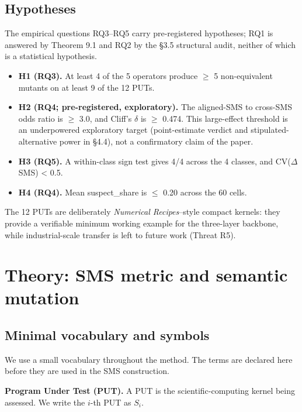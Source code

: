 \documentclass[acmsmall,screen,review]{acmart}
\providecommand{\tightlist}{\setlength{\itemsep}{0pt}\setlength{\parskip}{0pt}}
\begin{document}
\subsection{Hypotheses}\label{hypotheses}

The empirical questions RQ3--RQ5 carry pre-registered hypotheses; RQ1 is
answered by Theorem 9.1 and RQ2 by the §3.5 structural audit, neither of
which is a statistical hypothesis.

\begin{itemize}
\tightlist
\item
  \textbf{H1 (RQ3).} At least 4 of the 5 operators produce $\geq$ 5 non-equivalent
  mutants on at least 9 of the 12 PUTs.
\item
  \textbf{H2 (RQ4; pre-registered, exploratory).} The aligned-SMS to
  cross-SMS odds ratio is $\geq$ 3.0, and Cliff's $\delta$ is $\geq$ 0.474.
  This large-effect threshold is an underpowered exploratory target
  (point-estimate verdict and stipulated-alternative power in §4.4), not
  a confirmatory claim of the paper.
\item
  \textbf{H3 (RQ5).} A within-class sign test gives 4/4 across the 4 classes,
  and CV($\Delta$SMS) \textless{} 0.5.
\item
  \textbf{H4 (RQ4).} Mean suspect\_share is $\leq$ 0.20 across the 60 cells.
\end{itemize}

The 12 PUTs are deliberately \emph{Numerical Recipes}--style compact
kernels: they provide a verifiable minimum working example for the
three-layer backbone, while industrial-scale transfer is left to future
work (Threat R5).


\section{Theory: SMS metric and semantic mutation}\label{notation-and-equivalence-judgement}

\subsection{Minimal vocabulary and symbols}\label{vocabulary-inheritance}

We use a small vocabulary throughout the method. The terms are declared
here before they are used in the SMS construction.

\textbf{Program Under Test (PUT).} A PUT is the scientific-computing
kernel being assessed. We write the \(i\)-th PUT as \(S_i\).
\end{document}
